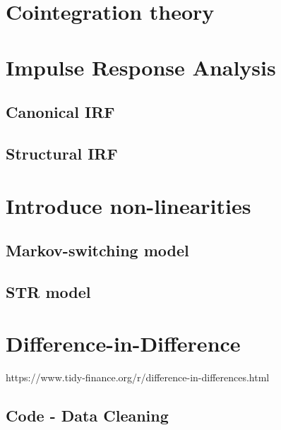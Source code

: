 \documentclass[hidelinks,12pts]{article}
\DeclareMathOperator{\1}{\mathbbm{1}}
\begin{document}
\section{Cointegration theory}\label{sec:cointegration}




\section{Impulse Response Analysis}\label{sec:irf}
    \subsection{Canonical IRF}\label{sec:canonical_irf}


    \subsection{Structural IRF}\label{sec:structural_irf}



\section{Introduce non-linearities}\label{sec:nonlinearities}
    \subsection{Markov-switching model}\label{sec:markov}

    
    \subsection{STR model}\label{sec:str}



\section{Difference-in-Difference}
https://www.tidy-finance.org/r/difference-in-differences.html
    



\newpage
\begin{appendices}
    
    \section{Code - Data Cleaning} \label{sec:dta_clean}
        

\end{appendices}
\end{document}
